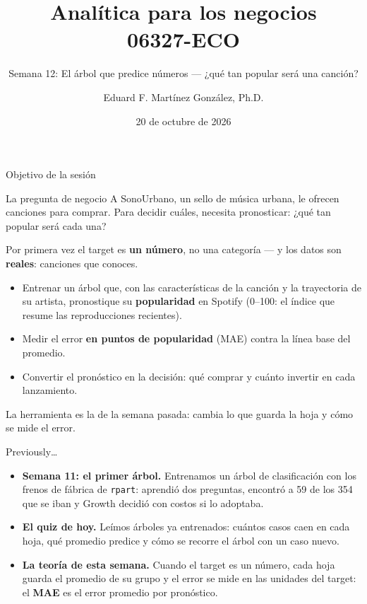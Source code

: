 \documentclass{beamer}
\title[06327-ECO]{Analítica para los negocios \\ 06327-ECO}
\subtitle{Semana 12: El árbol que predice números --- ¿qué tan popular será una canción?}
\author{Eduard F. Martínez González, Ph.D.}
\institute[]{Departamento de Economía, Universidad Icesi}
\date{20 de octubre de 2026}
\begin{document}
\begin{frame}
\titlepage
\end{frame}

\begin{frame}{Objetivo de la sesión}
\small
\begin{block}{La pregunta de negocio}
A SonoUrbano, un sello de música urbana, le ofrecen canciones para comprar. Para decidir cuáles, necesita pronosticar: ¿qué tan popular será cada una?
\end{block}

\vspace{0.2cm}
Por primera vez el target es \textbf{un número}, no una categoría --- y los datos son \textbf{reales}: canciones que conoces.
\begin{itemize} \setlength{\itemsep}{0.15cm}
  \item Entrenar un árbol que, con las características de la canción y la trayectoria de su artista, pronostique su \textbf{popularidad} en Spotify (0--100: el índice que resume las reproducciones recientes).
  \item Medir el error \textbf{en puntos de popularidad} (MAE) contra la línea base del promedio.
  \item Convertir el pronóstico en la decisión: qué comprar y cuánto invertir en cada lanzamiento.
\end{itemize}

\vspace{0.25cm}
\textcolor{azulcaso}{La herramienta es la de la semana pasada: cambia lo que guarda la hoja y cómo se mide el error.}
\end{frame}

\begin{frame}{Previously\ldots}
\small
\begin{itemize} \setlength{\itemsep}{0.25cm}
  \item \textbf{Semana 11: el primer árbol.} Entrenamos un árbol de clasificación con los frenos de fábrica de \texttt{rpart}: aprendió dos preguntas, encontró a 59 de los 354 que se iban y Growth decidió con costos si lo adoptaba.
  \item \textbf{El quiz de hoy.} Leímos árboles ya entrenados: cuántos casos caen en cada hoja, qué promedio predice y cómo se recorre el árbol con un caso nuevo.
  \item \textbf{La teoría de esta semana.} Cuando el target es un número, cada hoja guarda el promedio de su grupo y el error se mide en las unidades del target: el \textbf{MAE} es el error promedio por pronóstico.
\end{itemize}
\end{frame}
\end{document}
